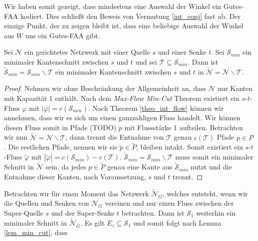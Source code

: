Wir haben somit gezeigt, dass mindestens eine Auswahl der Winkel ein Gutes-FAA kodiert. Dies schließt den Beweis von Vermutung \ref{int_conj} fast ab. Der einzige Punkt, der zu zeigen bleibt ist, dass eine beliebige Auswahl der Winkel aus $W$ uns ein Gutes-FAA gibt.

\begin{lemma}\label{lem_min_cut}
Sei $\mathcal{N}$ ein gerichtetes Netzwerk mit einer Quelle $s$ und einer Senke $t$. Sei $\mathcal{S}_{min}$ ein minimaler Kantenschnitt zwischen $s$ und $t$ und sei $\mathcal{T} \subseteq \mathcal{S}_{min}$. Dann ist $\tilde{\mathcal{S}}_{min} = \mathcal{S}_{min} \backslash \mathcal{T}$ ein minimaler Kantenschnitt zwischen $s$ und $t$ in $\tilde{\mathcal{N}} = \mathcal{N}\backslash \mathcal{T}$.
\end{lemma}

\begin{proof}
Nehmen wir ohne Beschränkung der Allgemeinheit an, dass $\mathcal{N}$ nur Kanten mit Kapazität 1 enthält. Nach dem \textit{Max-Flow Min-Cut} Theorem existiert ein $s$-$t$-Fluss $\varphi$ mit $|\varphi| = c(\mathcal{S}_{min})$. Nach Theorem \ref{theo_int_flow} können wir annehmen, dass wir es sich um einen ganzzahligen Fluss handelt. Wir können diesen Fluss somit in Pfade (TODO) $p$ mit Flussstärke 1 aufteilen. Betrachten wir nun $\tilde{\mathcal{N}} = \mathcal{N} \backslash \mathcal{T}$, dann trennt die Entnahme von $\mathcal{T}$ genau $c(\mathcal{T})$ Pfade $p \in P$. Die restlichen Pfade, nennen wir sie $\tilde{p} \in \tilde{P}$, bleiben intakt. Somit existiert ein $s$-$t$-Fluss $\tilde{\varphi}$ mit $|\tilde{\varphi}| = c(\mathcal{S}_{min}) - c(\mathcal{T})$. $\tilde{\mathcal{S}}_{min} = \mathcal{S}_{min} \backslash \mathcal{T}$ muss somit ein minimaler Schnitt in $\tilde{\mathcal{N}}$ sein, da jedes $p \in \tilde{P}$ genau eine Kante aus $\tilde{\mathcal{S}}_{min}$ nutzt und die Entnahme dieser Kanten, nach Voraussetzung, $s$ und $t$ trennt.
\end{proof}

Betrachten wir für einen Moment das Netzwerk $\tilde{\mathcal{N}}_G$, welches entsteht, wenn wir die Quellen und Senken von $\mathcal{N}_G$ vereinen und nur einen Fluss zwischen der Super-Quelle $s$ und der Super-Senke $t$ betrachten. Dann ist $\mathcal{S}_1$ weiterhin ein minimaler Schnitt in $\tilde{\mathcal{N}}_G$. Es gilt $E_z \subseteq \mathcal{S}_1$ und somit folgt nach Lemma \ref{lem_min_cut}, dass 